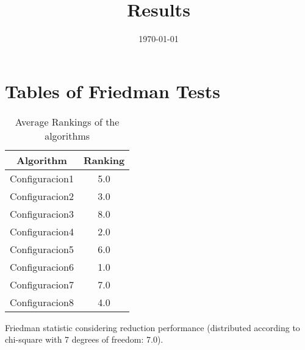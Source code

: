 \documentclass{article}
\title{Results}
\author{}
\date{\today}
\begin{document}
\oddsidemargin 0in \topmargin 0in\maketitle
\section{Tables of Friedman Tests}
\begin{table}[!htp]
\centering
\caption{Average Rankings of the algorithms
}\begin{tabular}{c|c}
Algorithm&Ranking\\
\hline
Configuracion1&5.0\\
Configuracion2&3.0\\
Configuracion3&8.0\\
Configuracion4&2.0\\
Configuracion5&6.0\\
Configuracion6&1.0\\
Configuracion7&7.0\\
Configuracion8&4.0\\
\end{tabular}
\end{table}


Friedman statistic considering reduction performance (distributed according to chi-square with 7 degrees of freedom: 7.0).
\end{document}
